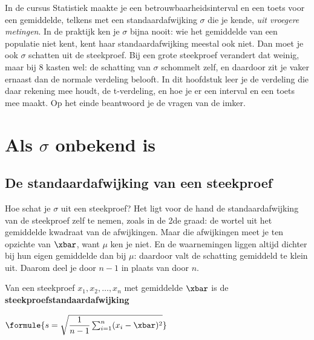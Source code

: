 In de cursus Statistiek maakte je een betrouwbaarheidsinterval en een toets voor een gemiddelde, telkens met een standaardafwijking $\sigma$ die je kende, \textit{uit vroegere metingen}. In de praktijk ken je $\sigma$ bijna nooit: wie het gemiddelde van een populatie niet kent, kent haar standaardafwijking meestal ook niet. Dan moet je ook $\sigma$ schatten uit de steekproef. Bij een grote steekproef verandert dat weinig, maar bij 8 kasten wel: de schatting van $\sigma$ schommelt zelf, en daardoor zit je vaker ernaast dan de normale verdeling belooft. In dit hoofdstuk leer je de verdeling die daar rekening mee houdt, de t-verdeling, en hoe je er een interval en een toets mee maakt. Op het einde beantwoord je de vragen van de imker.

\begin{oefeningen}[Start]

\end{oefeningen}


\section{Als $\sigma$ onbekend is}

\subsection{De standaardafwijking van een steekproef}

Hoe schat je $\sigma$ uit een steekproef? Het ligt voor de hand de standaardafwijking van de steekproef zelf te nemen, zoals in de 2de graad: de wortel uit het gemiddelde kwadraat van de afwijkingen. Maar die afwijkingen meet je ten opzichte van $\xbar$, want $\mu$ ken je niet. En de waarnemingen liggen altijd dichter bij hun eigen gemiddelde dan bij $\mu$: daardoor valt de schatting gemiddeld te klein uit. Daarom deel je door $n - 1$ in plaats van door $n$.

\begin{theorie}
Van een steekproef $x_1, x_2, \ldots, x_n$ met gemiddelde $\xbar$ is de \textbf{\textcolor{accent}{steekproefstandaardafwijking}}

\vspace{1mm}
\qquad $\formule{s = \sqrt{\dfrac{1}{n - 1} \sum_{i=1}^{n} (x_i - \xbar)^2}}$
\end{theorie}

